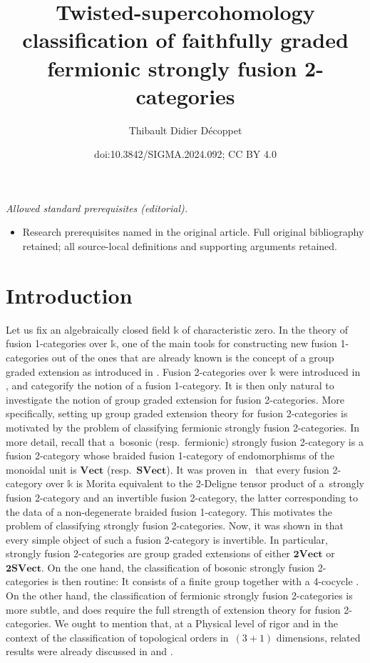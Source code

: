 \documentclass[10pt,a4paper]{amsart}
\title{Twisted-supercohomology classification of faithfully graded fermionic strongly fusion 2-categories}
\author{Thibault Didier Décoppet}
\date{doi:10.3842/SIGMA.2024.092; CC BY 4.0}
\numberwithin{equation}{section}
\begin{document}
\maketitle
\noindent\textit{Allowed standard prerequisites (editorial).}\begin{itemize}
\item Research prerequisites named in the original article. Full original bibliography retained; all source-local definitions and supporting arguments retained.
\end{itemize}\medskip
\section{Introduction}

Let us fix an algebraically closed field $\mathds{k}$ of characteristic zero. In the theory of fusion 1-categories over $\mathds{k}$, one of the main tools for constructing new fusion 1-categories out of the ones that are already known is the concept of a group graded extension as introduced in \cite{ENO2}. Fusion 2-ca\-tegories over $\mathds{k}$ were introduced in \cite{DR}, and categorify the notion of a fusion 1-category. It is then only natural to investigate the notion of group graded extension for fusion 2-categories. More specifically, setting up group graded extension theory for fusion 2-categories is motivated by the problem of classifying fermionic strongly fusion 2-categories. In more detail, recall that a~bosonic (resp.\ fermionic) strongly fusion 2-category is a fusion 2-category whose braided fusion 1-category of endomorphisms of the monoidal unit is $\mathbf{Vect}$ (resp.\ $\mathbf{SVect}$). It was proven in~\cite{D9} that every fusion 2-category over $\mathds{k}$ is Morita equivalent to the 2-Deligne tensor product of a~strongly fusion 2-category and an invertible fusion 2-category, the latter corresponding to the data of a non-degenerate braided fusion 1-category. This motivates the problem of classifying strongly fusion 2-categories. Now, it was shown in \cite{JFY} that every simple object of such a fusion 2-category is invertible. In particular, strongly fusion 2-categories are group graded extensions of either $\mathbf{2Vect}$ or $\mathbf{2SVect}$. On the one hand, the classification of bosonic strongly fusion 2-categories is then routine: It consists of a finite group together with a 4-cocycle \cite[Section~2.1]{DR}. On the other hand, the classification of fermionic strongly fusion 2-categories is more subtle, and does require the full strength of extension theory for fusion 2-categories. We ought to mention that, at a Physical level of rigor and in the context of the classification of topological orders in~$(3+1)$ dimensions, related results were already discussed in \cite{LW} and \cite{JF}.
\end{document}
